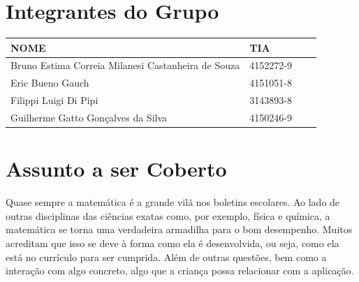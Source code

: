 \documentclass[
    12pt,               %
    openany,          	%
    twoside,            %
    a4paper,            %
    brazil              %
    ]{abntex2}
\begin{document}
\frenchspacing 


\imprimircapa

\clearpage
\imprimirfolhaderosto*

\clearpage
{}
\tableofcontents*
\cleardoublepage

\textual

\chapter{Integrantes do Grupo}

\begin{center}
\begin{tabular}{ | l | l | l | p{5cm} |}
\hline
NOME & TIA \\ \hline
Bruno Estima Correia Milanesi Castanheira de Souza
& 4152272-9 \\ \hline
Eric Bueno Gauch & 4151051-8 \\ \hline
Filippi Luigi Di Pipi & 3143893-8 \\ \hline
Guilherme Gatto Gonçalves da Silva & 4150246-9 \\ \hline
\end{tabular}
\end{center}

\chapter{Assunto a ser Coberto}

Quase sempre a matemática é a grande vilã nos boletins escolares. Ao lado de
outras disciplinas das ciências exatas como, por exemplo, física e química, a
matemática se torna uma verdadeira armadilha para o bom desempenho. Muitos
acreditam que isso se deve à forma como ela é desenvolvida, ou seja, como ela
está no currículo para ser cumprida. Além de outras questões, bem como a
interação com algo concreto, algo que a criança possa relacionar com a
aplicação.
\end{document}
